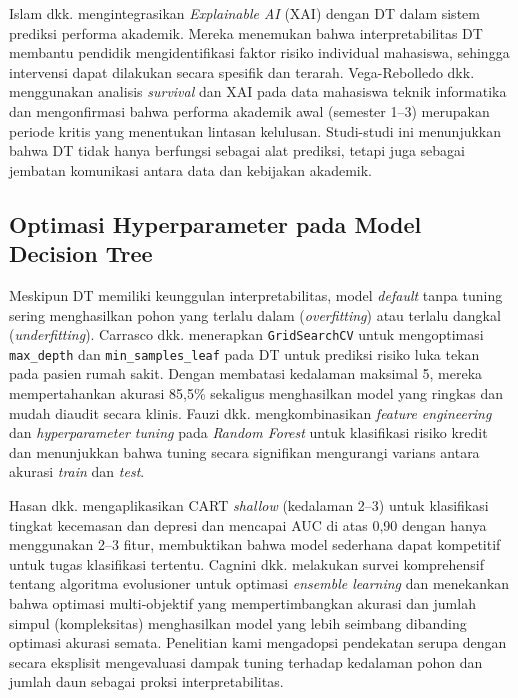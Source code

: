 \documentclass{ieeeaccess}
\begin{document}
Islam dkk. \cite{ref2} mengintegrasikan \emph{Explainable AI} (XAI) dengan DT dalam sistem prediksi performa akademik. Mereka menemukan bahwa interpretabilitas DT membantu pendidik mengidentifikasi faktor risiko individual mahasiswa, sehingga intervensi dapat dilakukan secara spesifik dan terarah. Vega-Rebolledo dkk. \cite{ref9} menggunakan analisis \emph{survival} dan XAI pada data mahasiswa teknik informatika dan mengonfirmasi bahwa performa akademik awal (semester 1--3) merupakan periode kritis yang menentukan lintasan kelulusan. Studi-studi ini menunjukkan bahwa DT tidak hanya berfungsi sebagai alat prediksi, tetapi juga sebagai jembatan komunikasi antara data dan kebijakan akademik.

\subsection{Optimasi Hyperparameter pada Model Decision Tree}
Meskipun DT memiliki keunggulan interpretabilitas, model \emph{default} tanpa tuning sering menghasilkan pohon yang terlalu dalam (\emph{overfitting}) atau terlalu dangkal (\emph{underfitting}). Carrasco dkk. \cite{ref15} menerapkan \texttt{GridSearchCV} untuk mengoptimasi \texttt{max\_depth} dan \texttt{min\_samples\_leaf} pada DT untuk prediksi risiko luka tekan pada pasien rumah sakit. Dengan membatasi kedalaman maksimal 5, mereka mempertahankan akurasi 85,5\% sekaligus menghasilkan model yang ringkas dan mudah diaudit secara klinis. Fauzi dkk. \cite{ref16} mengkombinasikan \emph{feature engineering} dan \emph{hyperparameter tuning} pada \emph{Random Forest} untuk klasifikasi risiko kredit dan menunjukkan bahwa tuning secara signifikan mengurangi varians antara akurasi \emph{train} dan \emph{test}.

Hasan dkk. \cite{ref11} mengaplikasikan CART \emph{shallow} (kedalaman 2--3) untuk klasifikasi tingkat kecemasan dan depresi dan mencapai AUC di atas 0,90 dengan hanya menggunakan 2--3 fitur, membuktikan bahwa model sederhana dapat kompetitif untuk tugas klasifikasi tertentu. Cagnini dkk. \cite{ref17} melakukan survei komprehensif tentang algoritma evolusioner untuk optimasi \emph{ensemble learning} dan menekankan bahwa optimasi multi-objektif yang mempertimbangkan akurasi dan jumlah simpul (kompleksitas) menghasilkan model yang lebih seimbang dibanding optimasi akurasi semata. Penelitian kami mengadopsi pendekatan serupa dengan secara eksplisit mengevaluasi dampak tuning terhadap kedalaman pohon dan jumlah daun sebagai proksi interpretabilitas.
\end{document}
